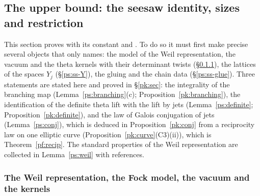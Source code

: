 \documentclass[10pt]{amsart}
\theoremstyle{definition}
\theoremstyle{remark}
\begin{document}
\subsection{The upper bound: the seesaw identity, sizes and restriction}\label{ps:sec}

This section proves {\cite[Lemma~14.21]{P46}} with its constant and
{\cite[Propositions~14.27, 14.24, 14.23, 14.25 and~14.19]{P46}}. To do so it must first make precise several objects that
{\cite[\S14.3]{P46}} only names: the model of the Weil representation, the vacuum and the theta
kernels with their determinant twists (\S\ref{ps:ss-weil}), the lattices of the spaces $Y_j$
(\S\ref{ps:ss-Y}), the gluing and the chain data (\S\ref{ps:ss-glue}). Three statements are stated
here and proved in \S\ref{pk:sec}: the integrality of the branching map
(Lemma~\ref{ps:branching}(c); Proposition~\ref{pk:branching}), the identification of the definite
theta lift with the lift by jets (Lemma~\ref{ps:definite}; Proposition~\ref{pk:definite}), and the
law of Galois conjugation of jets (Lemma~\ref{ps:conj}), which is deduced in
Proposition~\ref{pk:conj} from a reciprocity law on one elliptic curve
(Proposition~\ref{pk:curve}(C3)(ii)), which is Theorem~\ref{pf:recip}. The
standard properties of the Weil representation are collected in Lemma~\ref{ps:weil} with references.

\subsubsection{The Weil representation, the Fock model, the vacuum and the kernels}\label{ps:ss-weil}
\end{document}

